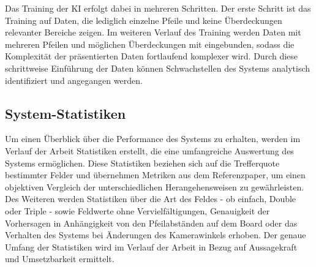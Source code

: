 Das Training der KI erfolgt dabei in mehreren Schritten. Der erste Schritt ist das Training auf Daten, die lediglich einzelne Pfeile und keine Überdeckungen relevanter Bereiche zeigen. Im weiteren Verlauf des Training werden Daten mit mehreren Pfeilen und möglichen Überdeckungen mit eingebunden, sodass die Komplexität der präsentierten Daten fortlaufend komplexer wird. Durch diese schrittweise Einführung der Daten können Schwachstellen des Systems analytisch identifiziert und angegangen werden.

\subsection{System-Statistiken}
\label{sec:methodik:statistiken}

Um einen Überblick über die Performance des Systems zu erhalten, werden im Verlauf der Arbeit Statistiken erstellt, die eine umfangreiche Auswertung des Systems ermöglichen. Diese Statistiken beziehen sich auf die Trefferquote bestimmter Felder und übernehmen Metriken aus dem Referenzpaper, um einen objektiven Vergleich der unterschiedlichen Herangehensweisen zu gewährleisten. Des Weiteren werden Statistiken über die Art des Feldes - ob einfach, Double oder Triple - sowie Feldwerte ohne Vervielfältigungen, Genauigkeit der Vorhersagen in Anhängigkeit von den Pfeilabständen auf dem Board oder das Verhalten des Systems bei Änderungen des Kamerawinkels erhoben. Der genaue Umfang der Statistiken wird im Verlauf der Arbeit in Bezug auf Aussagekraft und Umsetzbarkeit ermittelt.

